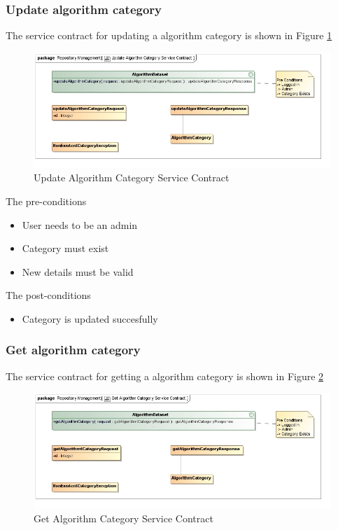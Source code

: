 \subsubsection {Update algorithm category}

The service contract for updating a algorithm category is shown in Figure \ref{fig:updateAlgorithmCatService}
\begin{figure}[H]
  \begin{center}
  \includegraphics[scale=0.6]{../Diagrams and Charts/Test Data/Update Algorithm Category Service Contract.jpg}
  \caption{Update Algorithm Category Service Contract}
  \label{fig:updateAlgorithmCatService}
  \end{center}
  
\end{figure}


The pre-conditions
\begin{itemize}
  \item User needs to be an admin
  \item Category must exist
  \item New details must be valid
\end{itemize}

The post-conditions
\begin{itemize}
  \item Category is updated succesfully
\end{itemize}
\subsubsection {Get algorithm category}

The service contract for getting a algorithm category is shown in Figure \ref{fig:getAlgorithmCatService}
\begin{figure}[H]
  \begin{center}
  \includegraphics[scale=0.6]{../Diagrams and Charts/Test Data/Get Algorithm Category Service Contract.jpg}
  \caption{Get Algorithm Category Service Contract}
  \label{fig:getAlgorithmCatService}
  \end{center}
  
\end{figure}

